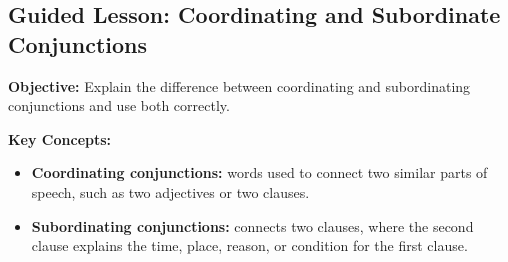 \documentclass[12pt]{article}
\title{}
\date{}
\begin{document}
\subsection*{Guided Lesson: Coordinating and Subordinate Conjunctions}
\onehalfspacing

\begin{tcolorbox}[colframe=black!40, colback=gray!5, 
coltitle=black, colbacktitle=black!20, fonttitle=\bfseries\Large, 
title=Learning Objective, halign title=center, left=5pt, right=5pt, top=5pt, bottom=15pt]
\textbf{Objective:} Explain the difference between coordinating and subordinating conjunctions and use both correctly. 
\end{tcolorbox}

\vspace{1em}

\begin{tcolorbox}[colframe=black!60, colback=white, 
coltitle=black, colbacktitle=black!15, fonttitle=\bfseries\Large, 
title=Key Concepts and Vocabulary, halign title=center, left=10pt, right=10pt, top=10pt, bottom=15pt]
\textbf{Key Concepts:}
\begin{itemize}

    \item \textbf{Coordinating conjunctions:} words used to connect two similar parts of speech, such as two adjectives or two clauses. 
    \item \textbf{Subordinating conjunctions:} connects two clauses, where the second clause explains the time, place, reason, or condition for the first clause.
\end{itemize}
\end{tcolorbox}

\vspace{1em}
\end{document}
